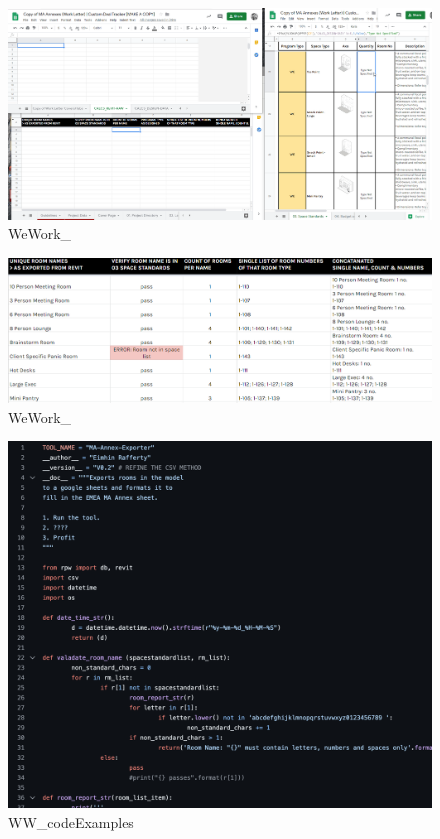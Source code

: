 \documentclass[
]{article}
\begin{document}
\begin{figure}[H]

{\centering \includegraphics{assets/WeWork/WeWork-Automation-Gsheet-MAAnnex.gif}

}

\caption{WeWork\_}

\end{figure}%
\begin{figure}[H]

{\centering \includegraphics{assets/WeWork/WeWork-Automation-Gsheet-DataCheck.png}

}

\caption{WeWork\_}

\end{figure}%
\begin{figure}[H]

{\centering \includegraphics{assets/WeWork/CODEEXAMPLE1.png}

}

\caption{WW\_codeExamples}

\end{figure}%
\end{document}
